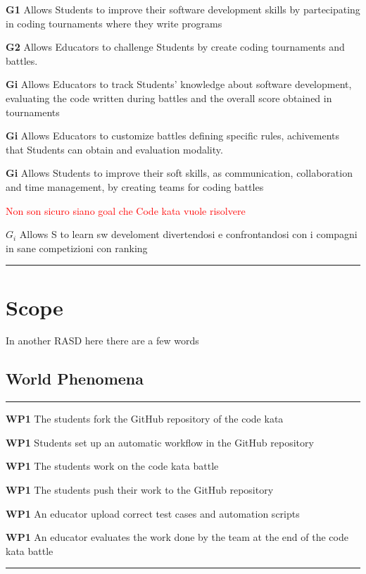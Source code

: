 \begin{description}
    \item \textbf{G1} \quad Allows Students to improve their software development skills by partecipating in coding tournaments where they write programs
    \item \textbf{G2} \quad Allows Educators to challenge Students by create coding tournaments and battles.
    \item \textbf{Gi} \quad Allows Educators to track Students' knowledge about software development, evaluating the code written during battles and the overall score obtained in tournaments
    \item \textbf{Gi} \quad Allows Educators to customize battles defining specific rules, achivements that Students can obtain and evaluation modality.
    \item \textbf{Gi} \quad Allows Students to improve their soft skills, as communication, collaboration and time management, by creating teams for coding battles
    \item {\textcolor{red}{Non son sicuro siano goal che Code kata vuole risolvere}}
    \item \(G_i\) Allows S to learn sw develoment divertendosi e confrontandosi con i compagni in sane competizioni con ranking
\end{description}
\par\noindent\rule{\textwidth}{0.5pt}

\blindtext
\section{Scope}

{\color{red} In another RASD here there are a few words}

\subsection{World Phenomena}
\par\noindent\rule{\textwidth}{0.5pt}
\begin{description}
    \item \textbf{WP1} \quad The students fork the GitHub repository of the code kata
    \item \textbf{WP1} \quad Students set up an automatic workflow in the GitHub repository
    \item \textbf{WP1} \quad The students work on the code kata battle
    \item \textbf{WP1} \quad The students push their work to the GitHub repository
    \item \textbf{WP1} \quad An educator upload correct test cases and automation scripts
    \item \textbf{WP1} \quad An educator evaluates the work done by the team at the end of the code kata battle
\end{description}
\par\noindent\rule{\textwidth}{0.5pt}


